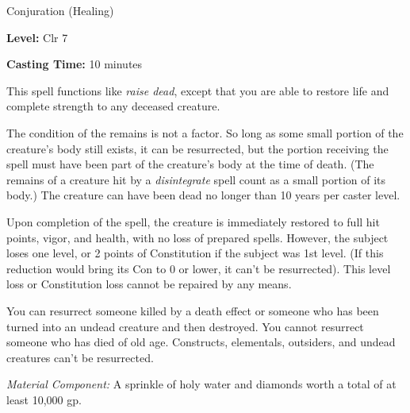 
Conjuration (Healing)

\textbf{Level:} Clr 7

\textbf{Casting Time:} 10 minutes

This spell functions like \textit{raise dead}, except that you are able to restore 
life and complete strength to any deceased creature.

The condition of the remains is not a factor. So long as some small portion of 
the creature's body still exists, it can be resurrected, but the portion receiving 
the spell must have been part of the creature's body at the time of death. (The 
remains of a creature hit by a \textit{disintegrate} spell count as a small portion 
of its body.) The creature can have been dead no longer than 10 years per caster 
level.

Upon completion of the spell, the creature is immediately restored to full hit 
points, vigor, and health, with no loss of prepared spells. However, the subject 
loses one level, or 2 points of Constitution if the subject was 1st level. (If 
this reduction would bring its Con to 0 or lower, it can't be resurrected). This 
level loss or Constitution loss cannot be repaired by any means.

You can resurrect someone killed by a death effect or someone who has been turned 
into an undead creature and then destroyed. You cannot resurrect someone who has 
died of old age. Constructs, elementals, outsiders, and undead creatures can't 
be resurrected.

\textit{Material Component:} A sprinkle of holy water and diamonds worth a total 
of at least 10,000 gp.

